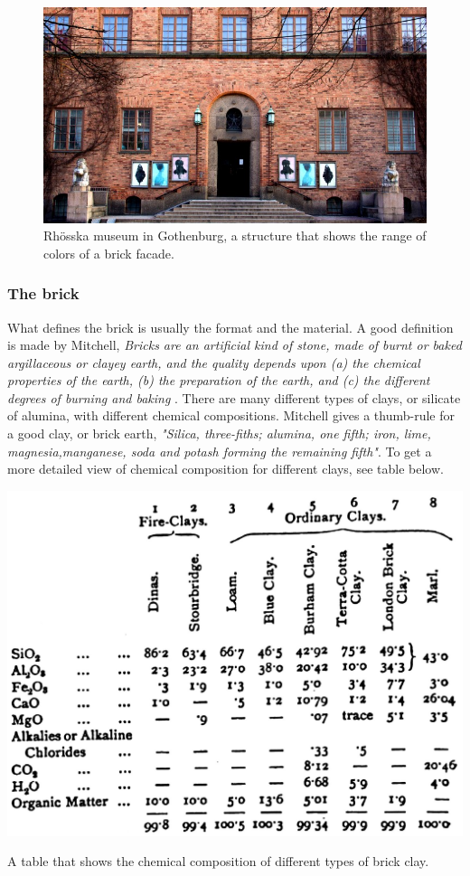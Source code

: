 \begin{figure}[H]
\centering
\includegraphics[width=1.0\linewidth ]{figure/Introduction/Rohsska.jpg}
\caption{Rhösska museum in Gothenburg, a structure that shows the range of colors of a brick facade.}
\label{fig:Rhösska}
\end{figure}





\subsubsection{The brick}
 
 What defines the brick is  usually the format and the material.  A good definition is made by Mitchell, \textit{Bricks are an artificial kind of stone, made of burnt or baked argillaceous or clayey earth, and the quality  depends upon (a) the chemical properties of the earth, (b) the preparation of the earth, and (c) the different degrees of burning and baking} \cite{ref:Mitchell}.
 There are many different types of clays, or silicate of alumina, with different chemical compositions. Mitchell gives a thumb-rule for a good clay, or brick earth, \textit{"Silica, three-fiths; alumina, one fifth; iron, lime, magnesia,manganese, soda and potash forming the remaining fifth"}\cite{ref:Mitchell}. To get a more detailed view of chemical composition for different clays, see table below. 


\begin{table}[H]
    \centering
    \includegraphics[width=0.7\linewidth ]{figure/Introduction/clays.pdf}
    \caption{ A table that shows the chemical composition of different types of brick clay.   \cite{ref:Mitchell}}
    \label{tab:my_label}
\end{table}

